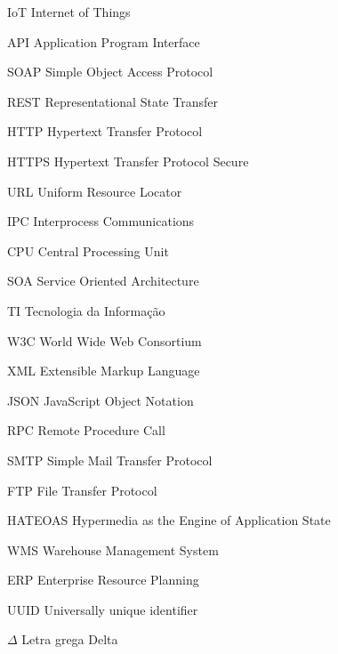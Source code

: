 \listoffigures*
\cleardoublepage

\listoftables*
\cleardoublepage
\begin{KeepFromToc}
\lstlistoflistings
\end{KeepFromToc}
\cleardoublepage

\begin{siglas}
  \item[IoT] Internet of Things
  \item[API] Application Program Interface
  \item[SOAP] Simple Object Access Protocol
  \item[REST] Representational State Transfer
  \item[HTTP] Hypertext Transfer Protocol
  \item[HTTPS] Hypertext Transfer Protocol Secure
  \item[URL] Uniform Resource Locator
  \item[IPC] Interprocess Communications
  \item[CPU] Central Processing Unit
  \item[SOA] Service Oriented Architecture
  \item[TI] Tecnologia da Informação
  \item[W3C] World Wide Web Consortium  
  \item[XML] Extensible Markup Language
  \item[JSON] JavaScript Object Notation
  \item[RPC] Remote Procedure Call
  \item[SMTP] Simple Mail Transfer Protocol
  \item[FTP] File Transfer Protocol
  \item[HATEOAS] Hypermedia as the Engine of Application State
  \item[WMS] Warehouse Management System
  \item[ERP] Enterprise Resource Planning
  \item[UUID] Universally unique identifier
  

\end{siglas}

\begin{simbolos}
  \item[$ \Delta $] Letra grega Delta
\end{simbolos}

\tableofcontents*
\cleardoublepage
